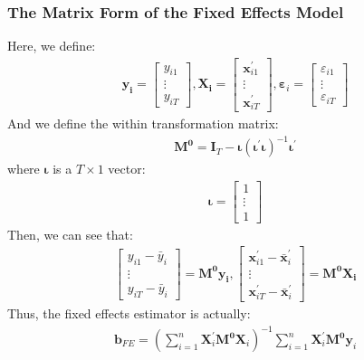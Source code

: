 \documentclass{article}
\begin{document}
\subsubsection{The Matrix Form of the Fixed Effects Model}
Here, we define:
	\begin{align*}
		\boldsymbol{y_i} = 
		\begin{bmatrix}
			y_{i1}\\
			\vdots\\
			y_{iT}
		\end{bmatrix},
		\boldsymbol{X_i} = 
		\begin{bmatrix}
			\boldsymbol{x}^\prime_{i1}\\
			\vdots\\
			\boldsymbol{x}^\prime_{iT}
		\end{bmatrix},
		\boldsymbol{\varepsilon}_i = 
		\begin{bmatrix}
			\varepsilon_{i1}\\
			\vdots\\
			\varepsilon_{iT}
		\end{bmatrix}
	\end{align*}
And we define the within transformation matrix:
	\begin{align*}
		\boldsymbol{M^0} = \boldsymbol{I}_T - \boldsymbol{\iota} (\boldsymbol{\iota}^\prime \boldsymbol{\iota})^{-1} \boldsymbol{\iota}^\prime
	\end{align*}
where $\boldsymbol{\iota}$ is a $T \times 1$ vector:
	\begin{align*}
		\boldsymbol{\iota} = 
		\begin{bmatrix}
			1\\
			\vdots\\
			1
		\end{bmatrix}
	\end{align*}
Then, we can see that:
	\begin{align*}
		\begin{bmatrix}
			y_{i1} - \bar{y}_i\\
			\vdots\\
			y_{iT} - \bar{y}_i
		\end{bmatrix} = 
		\boldsymbol{M^0} \boldsymbol{y_i},
		\begin{bmatrix}
			\boldsymbol{x}^\prime_{i1} - \bar{\boldsymbol{x}}^\prime_i\\
			\vdots\\
			\boldsymbol{x}^\prime_{iT} - \bar{\boldsymbol{x}}^\prime_i
		\end{bmatrix} = 
		\boldsymbol{M^0} \boldsymbol{X_i}
	\end{align*}
Thus, the fixed effects estimator is actually:
	\begin{align*}
		\boldsymbol{b}_{FE} = \left( \sum^n_{i=1} \boldsymbol{X}^\prime_i \boldsymbol{M^0} \boldsymbol{X}_i \right)^{-1} \sum^n_{i=1} \boldsymbol{X}^\prime_i \boldsymbol{M^0} \boldsymbol{y}_i 
	\end{align*}
\end{document}
